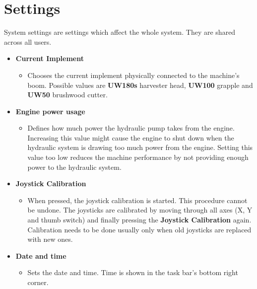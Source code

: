\documentclass[12pt,a4paper,english]{uvmanual}
\begin{document}
\section{Settings}\label{ch:system_settings}

System settings are settings which affect the whole system. They are shared across all users.



\begin{itemize}
 \item \textbf{Current Implement}
 \begin{itemize}
  \item Chooses the current implement physically connected to the machine's boom. Possible values are \textbf{UW180s} harvester head, \textbf{UW100} grapple and \textbf{UW50} brushwood cutter.
 \end{itemize}

 \item \textbf{Engine power usage}
 \begin{itemize}
  \item Defines how much power the hydraulic pump takes from the engine. Increasing this value might cause the engine to shut down when the hydraulic system is drawing too much power from the engine. Setting this value too low reduces the machine performance by not providing enough power to the hydraulic system.
 \end{itemize}

 \item \textbf{Joystick Calibration}
 \begin{itemize}
  \item When pressed, the joystick calibration is started. This procedure cannot be undone. The joysticks are calibrated by moving through all axes (X, Y and thumb switch) and finally pressing the \textbf{Joystick Calibration} again. Calibration needs to be done usually only when old joysticks are replaced with new ones.
 \end{itemize}

 \item \textbf{Date and time}
 \begin{itemize}
  \item Sets the date and time. Time is shown in the task bar's bottom right corner.
 \end{itemize}

\end{itemize}
\end{document}
